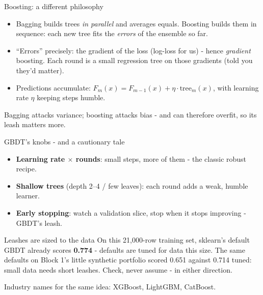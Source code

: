 \documentclass[10pt,aspectratio=169]{beamer}
\begin{document}
\begin{frame}{Boosting: a different philosophy}
  \begin{itemize}
    \item Bagging builds trees \emph{in parallel} and averages equals.
          Boosting builds them \alert{in sequence}: each new tree fits the
          \emph{errors} of the ensemble so far.
    \item ``Errors'' precisely: the \alert{gradient} of the loss (log-loss
          for us) - hence \emph{gradient} boosting. Each round is a small
          regression tree on those gradients (told you they'd matter).
    \item Predictions accumulate: $F_{m}(x) = F_{m-1}(x) + \eta \cdot
          \text{tree}_m(x)$, with learning rate $\eta$ keeping steps humble.
  \end{itemize}
  \vspace{0.5em}
  \begin{center}
    Bagging attacks \alert{variance}; boosting attacks \alert{bias} -
    and can therefore overfit, so its leash matters more.
  \end{center}
\end{frame}

\begin{frame}{GBDT's knobs - and a cautionary tale}
  \begin{itemize}\small
    \item \textbf{Learning rate $\times$ rounds}: small steps, more of them
          - the classic robust recipe.
    \item \textbf{Shallow trees} (depth 2--4 / few leaves): each round adds
          a weak, humble learner.
    \item \textbf{Early stopping}: watch a validation slice, stop when it
          stops improving - GBDT's leash.
  \end{itemize}
  \vspace{0.4em}
  \begin{alertblock}{Leashes are sized to the data}
    On this 21{,}000-row training set, sklearn's default GBDT already
    scores \textbf{0.774} - defaults are tuned for data this size. The
    same defaults on Block 1's little synthetic portfolio scored 0.651
    against 0.714 tuned: small data needs short leashes. Check, never
    assume - in either direction.
  \end{alertblock}
  \vspace{0.3em}
  \begin{center}\small
    Industry names for the same idea: XGBoost, LightGBM, CatBoost.
  \end{center}
\end{frame}
\end{document}

